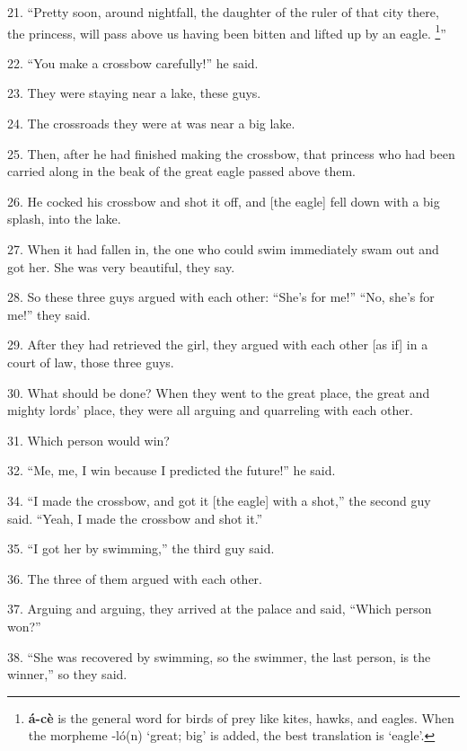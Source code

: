 21. ``Pretty soon, around nightfall, the daughter of the ruler of that city there,
the princess, will pass above us having been bitten and lifted up by an eagle.
\footnote{\textbf{á-cè} is the general word for birds of prey like kites, hawks, and eagles. When the morpheme -ló(n) `great; big' is added, the best translation is `eagle'.}''

22. ``You make a crossbow carefully!'' he said.

23. They were staying near a lake, these guys.

24. The crossroads they were at was near a big lake.

25. Then, after he had finished making the crossbow, that princess who had been
carried along in the beak of the great eagle passed above them.

26. He cocked his crossbow and shot it off, and [the eagle] fell down with a big
splash, into the lake.

27. When it had fallen in, the one who could swim immediately swam out and got
her. She was very beautiful, they say.

28. So these three guys argued with each other: ``She's for me!'' ``No, she's for
me!'' they said.

29. After they had retrieved the girl, they argued with each other [as if] in a
court of law, those three guys.

30. What should be done? When they went to the great place, the great and mighty
lords' place, they were all arguing and quarreling with each other.

31. Which person would win?

32. ``Me, me, I win because I predicted the future!'' he said.

34. ``I made the crossbow, and got it [the eagle] with a shot,'' the second guy
said. ``Yeah, I made the crossbow and shot it.''

35. ``I got her by swimming,'' the third guy said.

36. The three of them argued with each other.

37. Arguing and arguing, they arrived at the palace and said, ``Which person won?''

38. ``She was recovered by swimming, so the swimmer, the last person, is the winner,''
so they said.

